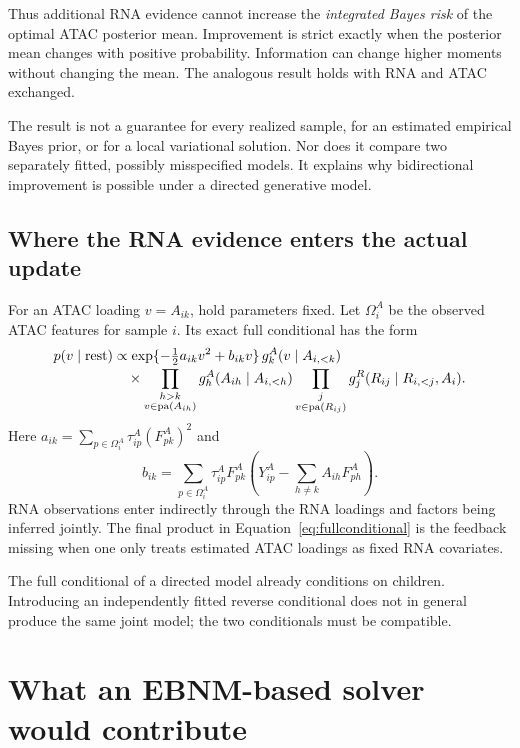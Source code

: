 \documentclass[11pt,a4paper]{article}
\newcommand{\pa}{\operatorname{pa}}
\numberwithin{equation}{section}
\begin{document}
Thus additional RNA evidence cannot increase the \emph{integrated
Bayes risk} of the optimal ATAC posterior mean. Improvement is strict
exactly when the posterior mean changes with positive probability.
Information can change higher moments without changing the mean.
The analogous result holds with RNA and ATAC exchanged.

The result is not a guarantee for every realized sample, for an
estimated empirical Bayes prior, or for a local variational solution.
Nor does it compare two separately fitted, possibly misspecified models.
It explains why bidirectional improvement is possible under a directed
generative model.

\subsection{Where the RNA evidence enters the actual update}
For an ATAC loading \(v=A_{ik}\), hold parameters fixed. Let \(\Omega_i^A\)
be the observed ATAC features for sample \(i\). Its exact
full conditional has the form
\begin{align}
p(v\mid\mathrm{rest})
&\propto
\exp\{-\tfrac12 a_{ik}v^2+b_{ik}v\}\,
g^A_k(v\mid A_{i,<k}) \notag\\[-2pt]
&\quad\times
\prod_{\substack{h>k\\v\in\pa(A_{ih})}}
g^A_h(A_{ih}\mid A_{i,<h})
\prod_{\substack{j\\v\in\pa(R_{ij})}}
g^R_j(R_{ij}\mid R_{i,<j},A_i).
\label{eq:fullconditional}
\end{align}
Here \(a_{ik}=\sum_{p\in\Omega_i^A}\tau^A_{ip}(F^A_{pk})^2\) and
\[
b_{ik}=\sum_{p\in\Omega_i^A}\tau^A_{ip}F^A_{pk}
\left(Y^A_{ip}-\sum_{h\ne k}A_{ih}F^A_{ph}\right).
\]
RNA observations enter indirectly through the RNA loadings and factors
being inferred jointly. The final product in
Equation~\eqref{eq:fullconditional} is the feedback missing when one only
treats estimated ATAC loadings as fixed RNA covariates.

The full conditional of a directed model already conditions on children.
Introducing an independently fitted reverse conditional does not in
general produce the same joint model; the two conditionals must be compatible.

\clearpage
\section{What an EBNM-based solver would contribute}
\end{document}

